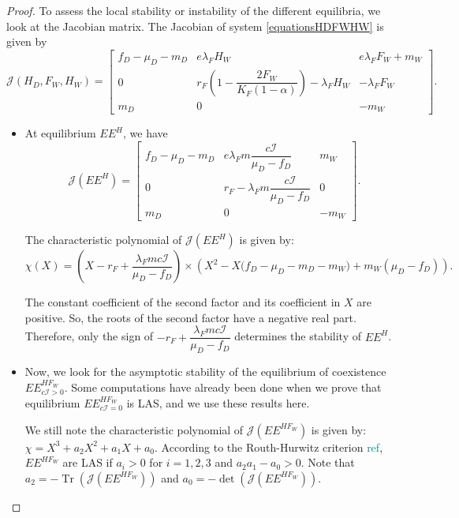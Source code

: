 \documentclass{article}
\newcommand{\lfw}{\lambda_{F}}
\newcommand{\lfw}{\lambda_{F}}
\newcommand{\cI}{c \mathcal{I}}
\newcommand{\marc}[1]{\textcolor{teal}{#1}}
\DeclareMathOperator{\Tr}{Tr}
\begin{document}
\begin{proof}
To assess the local stability or instability of the different equilibria, we look at the Jacobian matrix. The Jacobian of system \eqref{equationsHDFWHW} is given by
\begin{equation*}
\mathcal{J}(H_D, F_W, H_W) = \begin{bmatrix}
f_D-\mu_D - m_D & e \lfw H_W & e\lfw F_W + m_W \\
0 & r_F \left( 1 - \dfrac{2F_W}{K_F(1-\alpha)} \right) - \lfw H_W & - \lfw F_W \\
m_D & 0 & -m_W
\end{bmatrix}.
\end{equation*}
\begin{itemize}
\item At equilibrium $EE^{H}$, we have
\begin{equation*}
\mathcal{J}(EE^{H}) = \begin{bmatrix}
f_D-\mu_D - m_D & e \lfw m \dfrac{c\mathcal{I}}{\mu_D - f_D} & m_W \\
0 & r_F - \lfw m \dfrac{c\mathcal{I}}{\mu_D - f_D} & 0 \\
m_D & 0 & -m_W
\end{bmatrix}.
\end{equation*}


The characteristic polynomial of $\mathcal{J}(EE^{H})$ is given by:
\begin{equation*}
\chi(X) = (X - r_F + \dfrac{\lfw m c\mathcal{I}}{\mu_D - f_D}) \times \left(X^2 - X\Big(f_D - \mu_D - m_D - m_W \Big) + m_W(\mu_D - f_D)\right).
\end{equation*}

The constant coefficient of the second factor and its coefficient in $X$ are positive. So, the roots of the second factor have a negative real part. Therefore, only the sign of $-r_F + \dfrac{\lfw m c\mathcal{I}}{\mu_D - f_D}$ determines the stability of $EE^{H}$.

\item Now, we look for the asymptotic stability of the equilibrium of coexistence $EE^{HF_W}_{\cI > 0}$. Some computations have already been done when we prove that equilibrium $EE^{HF_W}_{\cI = 0}$ is LAS, and we use these results here. 

We still note the characteristic polynomial of $\mathcal{J}(EE^{H F_W})$ is given by: $\chi = X^3 + a_2 X^2 + a_1 X + a_0$. According to the Routh-Hurwitz criterion \marc{ref}, $EE^{H F_W}$ are LAS if $a_i > 0$ for $i=1,2,3$ and $a_2 a_1 - a_0 > 0$. Note that $a_2 = - \Tr(\mathcal{J}(EE^{H F_W}))$ and $a_0 = - \det (\mathcal{J}(EE^{H F_W}))$.


\end{itemize}
\end{proof}
\end{document}
